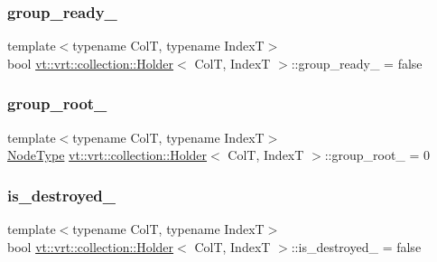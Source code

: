 \subsubsection{\texorpdfstring{group\+\_\+ready\+\_\+}{group\_ready\_}}
{\footnotesize\ttfamily template$<$typename ColT, typename IndexT$>$ \\
bool \hyperlink{structvt_1_1vrt_1_1collection_1_1_holder}{vt\+::vrt\+::collection\+::\+Holder}$<$ ColT, IndexT $>$\+::group\+\_\+ready\+\_\+ = false\hspace{0.3cm}{\ttfamily [private]}}

\mbox{\label{structvt_1_1vrt_1_1collection_1_1_holder_a2809b2adf064822eeab947991e8f12d3}} 
\subsubsection{\texorpdfstring{group\+\_\+root\+\_\+}{group\_root\_}}
{\footnotesize\ttfamily template$<$typename ColT, typename IndexT$>$ \\
\hyperlink{namespacevt_a866da9d0efc19c0a1ce79e9e492f47e2}{Node\+Type} \hyperlink{structvt_1_1vrt_1_1collection_1_1_holder}{vt\+::vrt\+::collection\+::\+Holder}$<$ ColT, IndexT $>$\+::group\+\_\+root\+\_\+ = 0\hspace{0.3cm}{\ttfamily [private]}}

\mbox{\label{structvt_1_1vrt_1_1collection_1_1_holder_a862e7f99e626f9ea11de83b635466cab}} 
\subsubsection{\texorpdfstring{is\+\_\+destroyed\+\_\+}{is\_destroyed\_}}
{\footnotesize\ttfamily template$<$typename ColT, typename IndexT$>$ \\
bool \hyperlink{structvt_1_1vrt_1_1collection_1_1_holder}{vt\+::vrt\+::collection\+::\+Holder}$<$ ColT, IndexT $>$\+::is\+\_\+destroyed\+\_\+ = false\hspace{0.3cm}{\ttfamily [private]}}

